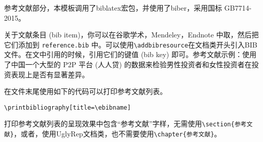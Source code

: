 参考文献部分，本模板调用了biblatex宏包，并使用了biber，采用国标 GB7714-2015。

关于文献条目 (bib item)，你可以在谷歌学术，Mendeley，Endnote 中取，然后把它们添加到 \texttt{reference.bib} 中。可以使用\texttt{\textbackslash addbibresource}在文档类开头引入BIB文件。在文中引用的时候，引用它们的键值 (bib key) 即可。参考文献示例：\cite{cn1,en2,en3}使用了中国一个大型的 P2P 平台 (人人贷) 的数据来检验男性投资者和女性投资者在投资表现上是否有显著差异。

在文件末尾使用如下的代码可以打印参考文献列表。

\begin{verbatim}
\printbibliography[title=\ebibname]
\end{verbatim}

\begin{note}
  打印参考文献列表的呈现效果中包含“\textcolor{ecolor}{参考文献}”字样，无需使用\texttt{\textbackslash section\{参考文献\}}，或者，使用UglyRep文档类，也不需要使用\texttt{\textbackslash chapter\{参考文献\}}。
\end{note}